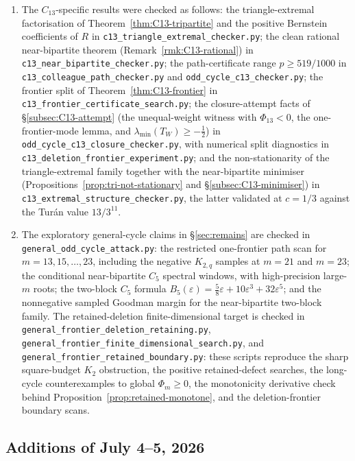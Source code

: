 \documentclass[11pt]{article}
\newcommand{\eps}{\varepsilon}
\begin{document}
\begin{enumerate}[label=\textup{(\arabic*)}]
    \item The $C_{13}$-specific results were checked as follows: the triangle-extremal factorisation of Theorem~\ref{thm:C13-tripartite} and the positive Bernstein coefficients of $R$ in \texttt{c13\_triangle\_extremal\_checker.py}; the clean rational near-bipartite theorem (Remark~\ref{rmk:C13-rational}) in \texttt{c13\_near\_bipartite\_checker.py}; the path-certificate range $p\ge519/1000$ in \texttt{c13\_colleague\_path\_checker.py} and \texttt{odd\_cycle\_c13\_checker.py}; the frontier split of Theorem~\ref{thm:C13-frontier} in \texttt{c13\_frontier\_\allowbreak certificate\_\allowbreak search.py}; the closure-attempt facts of \S\ref{subsec:C13-attempt} (the unequal-weight witness with $\Phi_{13}<0$, the one-frontier-mode lemma, and $\lambda_{\min}(T_W)\ge-\tfrac12$) in \texttt{odd\_cycle\_c13\_closure\_checker.py}, with numerical split diagnostics in \texttt{c13\_deletion\_\allowbreak frontier\_\allowbreak experiment.py}; and the non-stationarity of the triangle-extremal family together with the near-bipartite minimiser (Propositions~\ref{prop:tri-not-stationary} and \S\ref{subsec:C13-minimiser}) in \texttt{c13\_extremal\_structure\_checker.py}, the latter validated at $c=1/3$ against the Tur\'an value $13/3^{11}$.
    \item The exploratory general-cycle claims in \S\ref{sec:remains} are checked in \texttt{general\_odd\_cycle\_attack.py}: the restricted one-frontier path scan for $m=13,15,\ldots,23$, including the negative $K_{2,q}$ samples at $m=21$ and $m=23$; the conditional near-bipartite $C_5$ spectral windows, with high-precision large-$m$ roots; the two-block $C_5$ formula $B_5(\eps)=\frac58\eps+10\eps^3+32\eps^5$; and the nonnegative sampled Goodman margin for the near-bipartite two-block family.  The retained-deletion finite-dimensional target is checked in \texttt{general\_frontier\_\allowbreak deletion\_\allowbreak retaining.py}, \texttt{general\_frontier\_\allowbreak finite\_\allowbreak dimensional\_\allowbreak search.py}, and \texttt{general\_frontier\_\allowbreak retained\_\allowbreak boundary.py}: these scripts reproduce the sharp square-budget $K_2$ obstruction, the positive retained-defect searches, the long-cycle counterexamples to global $\Phi_m\ge0$, the monotonicity derivative check behind Proposition~\ref{prop:retained-monotone}, and the deletion-frontier boundary scans.
\end{enumerate}


\subsection*{Additions of July 4--5, 2026}
\end{document}
